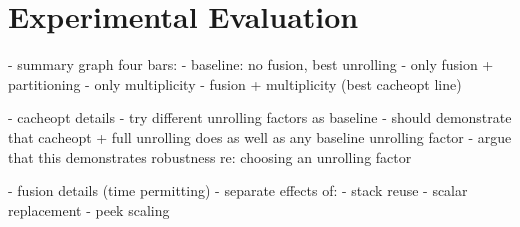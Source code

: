 \section{Experimental Evaluation}
\label{sec:evaluation}

- summary graph four bars:
  - baseline: no fusion, best unrolling
  - only fusion + partitioning
  - only multiplicity
  - fusion + multiplicity (best cacheopt line)

- cacheopt details
  - try different unrolling factors as baseline
  - should demonstrate that cacheopt + full unrolling does as well as
    any baseline unrolling factor
  - argue that this demonstrates robustness re: choosing an unrolling factor

- fusion details (time permitting)
  - separate effects of:
     - stack reuse
     - scalar replacement
     - peek scaling
